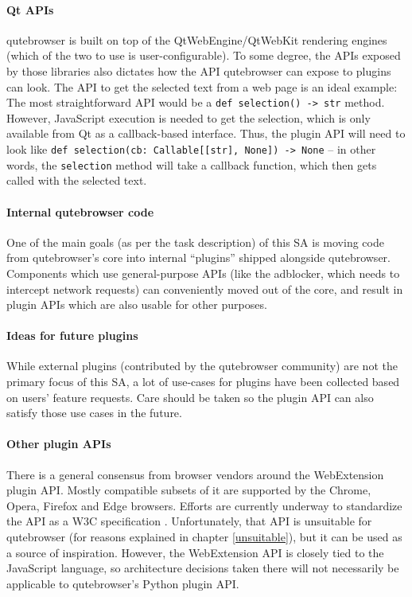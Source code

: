 \documentclass[a4paper,parskip=full]{scrreprt}
\newcommand{\py}[1]{\texttt{#1}}
\begin{document}
\paragraph{Qt APIs} qutebrowser is built on top of the QtWebEngine/QtWebKit
rendering engines (which of the two to use is user-configurable). To some
degree, the APIs exposed by those libraries also dictates how the API
qutebrowser can expose to plugins can look. The API to get the selected text
from a web page is an ideal example: The most straightforward API would be a
\py{def selection() -> str} method. However, JavaScript execution is needed to get
the selection, which is only available from Qt as a callback-based interface.
Thus, the plugin API will need to look like
\py{def selection(cb: Callable[[str], None]) -> None} --
in other words, the \py{selection} method will take a
callback function, which then gets called with the selected text.

\paragraph{Internal qutebrowser code} One of the main goals (as per the task
description) of this SA is moving code from qutebrowser's core into internal
``plugins'' shipped alongside qutebrowser. Components which use general-purpose
APIs (like the adblocker, which needs to intercept network requests) can
conveniently moved out of the core, and result in plugin APIs which are also
usable for other purposes.

\paragraph{Ideas for future plugins} While external plugins (contributed by the
qutebrowser community) are not the primary focus of this SA, a lot of use-cases
for plugins have been collected based on users' feature requests. Care should be
taken so the plugin API can also satisfy those use cases in the future.

\paragraph{Other plugin APIs} There is a general consensus from browser vendors
around the WebExtension plugin API. Mostly compatible subsets of it are
supported by the Chrome, Opera, Firefox and Edge browsers. Efforts are currently
underway to standardize the API as a W3C specification \citep{w3c-webext}.
Unfortunately, that API is unsuitable for qutebrowser (for reasons explained in
chapter \ref{unsuitable}), but it can be used as a source of inspiration.
However, the WebExtension API is closely tied to the JavaScript language, so
architecture decisions taken there will not necessarily be applicable to
qutebrowser's Python plugin API.
\end{document}
